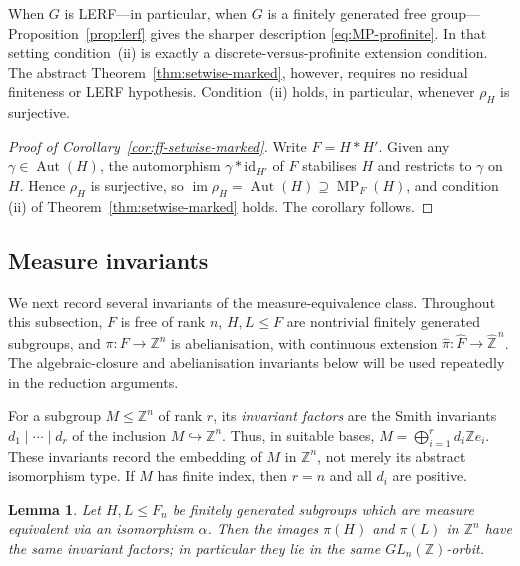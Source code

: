 \documentclass[11pt]{amsart}
\theoremstyle{plain}
\newtheorem{lemma}[theorem]{Lemma}
\theoremstyle{definition}
\newcommand{\Aut}{\operatorname{Aut}}
\newcommand{\MP}{\operatorname{MP}}
\newcommand{\Zhat}{\widehat{\mathbb{Z}}}
\newcommand{\Fhat}{\widehat{F}}
\begin{document}
When $G$ is LERF---in particular, when $G$ is a finitely generated free
group---Proposition~\ref{prop:lerf} gives the sharper description
\eqref{eq:MP-profinite}.  In that setting condition~(ii) is exactly a
discrete-versus-profinite extension condition.  The abstract
Theorem~\ref{thm:setwise-marked}, however, requires no residual finiteness or
LERF hypothesis.  Condition~(ii) holds, in particular, whenever $\rho_H$ is
surjective.

\begin{proof}[Proof of Corollary~\ref{cor:ff-setwise-marked}]
Write $F=H*H'$.  Given any $\gamma\in\Aut(H)$, the automorphism
$\gamma*\mathrm{id}_{H'}$ of $F$ stabilises $H$ and restricts to $\gamma$ on $H$.
Hence $\rho_H$ is surjective, so
$\operatorname{im}\rho_H=\Aut(H)\supseteq\MP_F(H)$, and condition (ii) of
Theorem~\ref{thm:setwise-marked} holds.  The corollary follows.
\end{proof}



\subsection{Measure invariants}\label{sec:invariants}


We next record several invariants of the measure-equivalence class. Throughout
this subsection, $F$ is free of rank $n$, $H,L\le F$ are nontrivial finitely
generated subgroups, and
$\pi\colon F\to\mathbb Z^n$ is abelianisation, with continuous extension
$\widehat\pi\colon\Fhat\to\Zhat^{\,n}$. The algebraic-closure and abelianisation
invariants below will be used repeatedly in the reduction arguments.

For a subgroup $M\le\mathbb Z^n$ of rank $r$, its \emph{invariant factors}
are the Smith invariants $d_1\mid\cdots\mid d_r$ of the inclusion
$M\hookrightarrow\mathbb Z^n$. Thus, in suitable bases,
$M=\bigoplus_{i=1}^r d_i\mathbb Z e_i$. These invariants record the embedding of
$M$ in $\mathbb Z^n$, not merely its abstract isomorphism type. If $M$ has finite
index, then $r=n$ and all $d_i$ are positive.

\begin{lemma}\label{lem:abelian-invariant}
Let $H,L\le F_n$ be finitely generated subgroups which are measure equivalent via
an isomorphism $\alpha$.  Then the images $\pi(H)$ and $\pi(L)$ in
$\mathbb Z^{n}$ have the same invariant factors; in particular they lie in the
same $GL_n(\mathbb Z)$-orbit.
\end{lemma}
\end{document}
